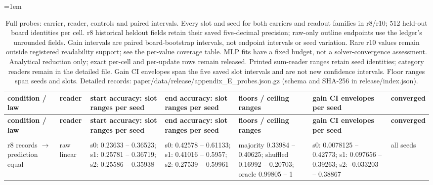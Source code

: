 \begingroup\fontsize{8}{9.5}\selectfont\setlength{\tabcolsep}{3pt}\emergencystretch=1em
\begin{longtable}{@{}>{\raggedright\arraybackslash}p{1.392in}>{\raggedright\arraybackslash}p{0.576in}>{\raggedright\arraybackslash}p{0.816in}>{\raggedright\arraybackslash}p{0.816in}>{\raggedright\arraybackslash}p{0.960in}>{\raggedright\arraybackslash}p{0.864in}>{\raggedright\arraybackslash}p{0.576in}@{}}
\caption{Full probes: carrier, reader, controls and paired intervals. Every slot and seed for both carriers and readout families in r8/\allowbreak{}r10; 512 held-out board identities per cell. r8 historical heldout fields retain their saved five-decimal precision; raw-only outline endpoints use the ledger's unrounded fields. Gain intervals are paired board-bootstrap intervals, not endpoint intervals or seed variation. Rare r10 values remain outside registered readability support; see the per-value coverage table. MLP fits have a fixed budget, not a solver-convergence assessment. Analytical reduction only; exact per-cell and per-update rows remain released. Printed sum-reader ranges retain seed identities; category readers remain in the detailed file. Gain CI envelopes span the five saved slot intervals and are not new confidence intervals. Floor ranges span seeds and slots. Detailed records: paper/\allowbreak{}data/\allowbreak{}release/\allowbreak{}appendix\_\allowbreak{}E\_\allowbreak{}probes.json.gz (schema and SHA-256 in release/\allowbreak{}index.json).}\label{tab:appendix_E_probes}\\
\toprule
\textbf{condition /\allowbreak{} law} & \textbf{reader} & \textbf{start accuracy: slot ranges per seed} & \textbf{end accuracy: slot ranges per seed} & \textbf{floors /\allowbreak{} ceiling ranges} & \textbf{gain CI envelopes per seed} & \textbf{converged} \\
\midrule\endfirsthead
\toprule
\textbf{condition /\allowbreak{} law} & \textbf{reader} & \textbf{start accuracy: slot ranges per seed} & \textbf{end accuracy: slot ranges per seed} & \textbf{floors /\allowbreak{} ceiling ranges} & \textbf{gain CI envelopes per seed} & \textbf{converged} \\
\midrule\endhead
\midrule\multicolumn{7}{r}{Continued on next page}\\\endfoot
\bottomrule\endlastfoot
r8 records $\to$ prediction equal & raw linear & s0: 0.23633 -- 0.36523; s1: 0.25781 -- 0.36719; s2: 0.25586 -- 0.35938 & s0: 0.42578 -- 0.61133; s1: 0.41016 -- 0.5957; s2: 0.27539 -- 0.59961 & majority 0.33984 -- 0.40625; shuffled 0.16992 -- 0.20703; oracle 0.99805 -- 1 & s0: 0.0078125 -- 0.42773; s1: 0.097656 -- 0.39263; s2: -0.033203 -- 0.38867 & all seeds \\

\end{longtable}
